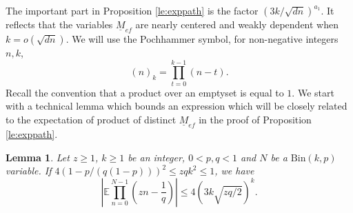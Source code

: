 \documentclass[11pt]{article}
\newtheorem{lemma}{Lemma}
\newcommand{\BIN}{{\mathrm{Bin}}}
\newcommand{\dE}{\mathbb {E}}
\newcommand{\ABS}[1]{{{\left| #1 \right|}}} %
\newcommand{\PAR}[1]{{{\left(#1\right)}}} %
\newcommand{\1}{1\!\!{\sf I}}\newcommand{\IND}{\1}
\begin{document}
The important part in Proposition \ref{le:exppath} is the factor $( 3k   / \sqrt{dn} )^{a_1}$. It reflects  that the variables $\underline M_{ef}$ are nearly centered and weakly dependent when $k = o (\sqrt{dn})$. We will use the Pochhammer symbol, for non-negative integers $n, k$,
$$
(n)_k = \prod_{t = 0}^{k-1} (n -t).  
$$
Recall the convention that a product over an emptyset is equal to $1$.   We start with a technical lemma which bounds an expression which will be closely related to the expectation of product of distinct $\underline M_{ef}$ in  the proof of Proposition \ref{le:exppath}.
\begin{lemma}\label{le:bin}
Let $z\geq 1$, $k \geq 1$ be an integer, $0 < p , q < 1$ and $N$ be a $\BIN ( k , p)$ variable. If  $4 ( 1 -  p/ (q ( 1 - p))) ^2   \leq  zq k ^2 \leq 1$, we have
$$
\ABS{ \dE \prod_{n=0}^{N-1} \PAR{ z n -  \frac 1 q } } \leq  4 \PAR{  3 k   \sqrt{  z q /2}} ^k. 
$$
\end{lemma}
 
\end{document}
